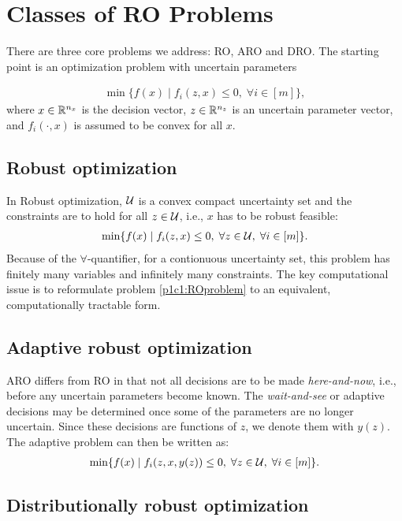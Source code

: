 \section{Classes of RO Problems}

There are three core problems we address: RO, ARO and DRO. The starting point is an optimization problem with uncertain parameters

\begin{align*}
	\min \{f(x) \mid f_i(z,x)\leq0,\;\forall i\in[m]\},
\end{align*}
where $x\in\mathbb{R}^{n_x}$ is the decision vector, $z\in\mathbb{R}^{n_z}$ is an uncertain parameter vector, and $f_i(\cdot,x)$ is assumed to be convex for all $x$.

\subsection{Robust optimization}
In Robust optimization, $\mathcal{U}$ is a convex compact uncertainty set and the constraints are to hold for all $z\in\mathcal{U}$, i.e., $x$ has to be robust feasible:
\begin{align}\label{p1c1:ROproblem}
	\min \{f(x) \mid f_i(z,x)\leq0,\;\forall z\in\mathcal{U},\;\forall i\in[m]\}.
\end{align}
Because of the $\forall$-quantifier, for a contionuous uncertainty set, this problem has finitely many variables  and infinitely many constraints. The key computational issue is to reformulate problem \eqref{p1c1:ROproblem} to an equivalent, computationally tractable form.

\subsection{Adaptive robust optimization}

ARO differs from RO in that not all decisions are to be made \textit{here-and-now}, i.e., before any uncertain parameters become known. The \textit{wait-and-see} or adaptive decisions may be determined once some of the parameters are no longer uncertain. Since these decisions are functions of $z$, we denote them with $y(z)$. The adaptive problem can then be written as: 
\begin{align}\label{p1c1:ROproblem}
	\min \{f(x) \mid f_i(z,x,y(z))\leq0,\;\forall z\in\mathcal{U},\;\forall i\in[m]\}.
\end{align}

\subsection{Distributionally robust optimization}

